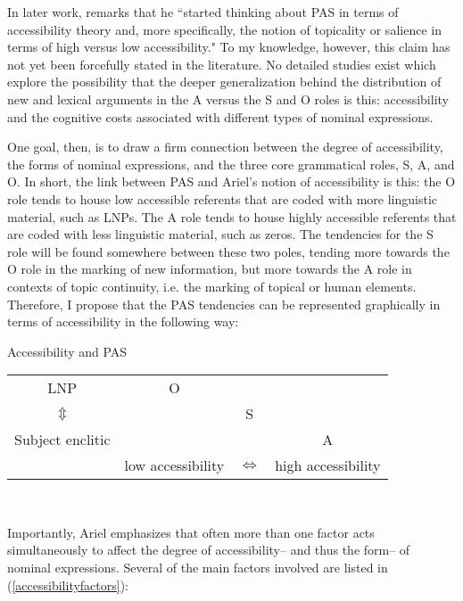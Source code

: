 In later work, \citet[194]{dubois2006} remarks that he ``started thinking about PAS in terms of accessibility theory and, more specifically, the notion of topicality or salience in terms of high versus low accessibility." To my knowledge, however, this claim has not yet been forcefully stated in the literature. No detailed studies exist which explore the possibility that the deeper generalization behind the distribution of new and lexical arguments in the A versus the S and O roles is this: accessibility and the cognitive costs associated with different types of nominal expressions.

One goal, then, is to draw a firm connection between the degree of accessibility, the forms of nominal expressions, and the three core grammatical roles, S, A, and O. In short, the link between PAS and Ariel's notion of accessibility is this: the O role tends to house low accessible referents that are coded with more linguistic material, such as LNPs. The A role tends to house highly accessible referents that are coded with less linguistic material, such as zeros. The tendencies for the S role will be found somewhere between these two poles, tending more towards the O role in the marking of new information, but more towards the A role in contexts of topic continuity, i.e. the marking of topical or human elements. Therefore, I propose that the PAS tendencies can be represented graphically in terms of accessibility in the following way: 

\ea\label{graphic} Accessibility and PAS

\begin{tabular}{ c  c  c  c } 
LNP & O &  & \\

$\Updownarrow$ &  &  S &   \\

Subject enclitic &  &  & A  \\

\midrule 
 & low accessibility  &  $\Leftrightarrow$ & high accessibility \\
 
\end{tabular}\\ 

\z

Importantly, Ariel emphasizes that often more than one factor acts simultaneously to affect the degree of accessibility-- and thus the form-- of nominal expressions. Several of the main factors involved are listed in (\ref{accessibilityfactors}): 

